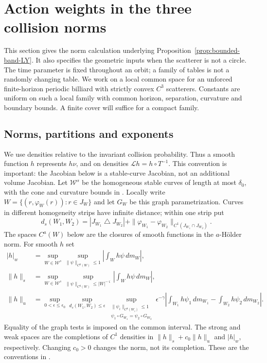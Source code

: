 \section{Action weights in the three collision norms}
\label{sec:action-norm-details}
This section gives the norm calculation underlying
Proposition~\ref{prop:bounded-band-LY}. It also specifies the geometric
inputs when the scatterer is not a circle. The time parameter is fixed
throughout an orbit; a family of tables is not a randomly changing table.
We work on a local common space for an unforced finite-horizon periodic
billiard with strictly convex $C^3$ scatterers. Constants are uniform on
such a local family with common horizon, separation, curvature and
boundary bounds. A finite cover will suffice for a compact family.

\subsection{Norms, partitions and exponents}
We use densities relative to the invariant collision probability.
Thus a smooth function $h$ represents $h\nu$, and on densities
$\mathcal L h=h\circ T^{-1}$. This convention is important: the
Jacobian below is a stable-curve Jacobian, not an additional volume
Jacobian. Let $\mathcal W^s$ be the homogeneous stable curves of length
at most $\delta_0$, with the cone and curvature bounds in
\cite[Section 3.3]{DZ}. Locally write $W=\{(r,\varphi_W(r)):r\in J_W\}$
and let $G_W$ be this graph parametrization. Curves in different
homogeneity strips have infinite distance; within one strip put
\[
 d_s(W_1,W_2)=|J_{W_1}\mathbin\triangle J_{W_2}|
       +\|\varphi_{W_1}-\varphi_{W_2}\|_{C^1(J_{W_1}\cap J_{W_2})}.
\]
The spaces $C^a(W)$ below are the closures of smooth functions in the
$a$-H\"older norm. For smooth $h$ set
\begin{align}
 |h|_w&=\sup_{W\in\mathcal W^s}\sup_{\|\psi\|_{C^p(W)}\le1}
                         \left|\int_W h\psi\,dm_W\right|,
                                             \label{eq:v35-weak-norm}\\
 \|h\|_s&=\sup_{W\in\mathcal W^s}
       \sup_{\|\psi\|_{C^q(W)}\le |W|^{-\varsigma}}
                         \left|\int_W h\psi\,dm_W\right|,
                                             \label{eq:v35-stable-norm}\\
 \|h\|_u&=\sup_{0<\epsilon\le\epsilon_0}
       \sup_{d_s(W_1,W_2)\le\epsilon}
       \sup_{\substack{\|\psi_i\|_{C^p(W_i)}\le1\\
                \psi_1\circ G_{W_1}=\psi_2\circ G_{W_2}}}
       \epsilon^{-\gamma}
       \left|\int_{W_1}h\psi_1\,dm_{W_1}
                    -\int_{W_2}h\psi_2\,dm_{W_2}\right|.
                                             \label{eq:v35-unstable-norm}
\end{align}
Equality of the graph tests is imposed on the common interval. The
strong and weak spaces are the completions of $C^1$ densities in
$\|h\|_s+c_0\|h\|_u$ and $|h|_w$, respectively. Changing $c_0>0$
changes the norm, not its completion. These are the conventions in
\cite[Section 3.1]{DPZ}.

